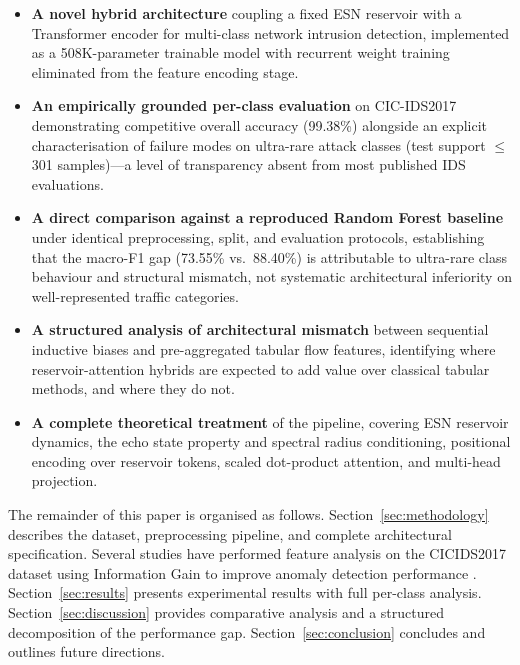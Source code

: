 \documentclass[5p,times]{elsarticle}
\begin{document}
	\begin{itemize}[leftmargin=15pt,itemsep=3pt,topsep=4pt]
		
		\item \textbf{A novel hybrid architecture} coupling a fixed ESN
		reservoir with a Transformer encoder for multi-class network
		intrusion detection, implemented as a 508K-parameter trainable
		model with recurrent weight training eliminated from the feature
		encoding stage.
		
		\item \textbf{An empirically grounded per-class evaluation} on
		CIC-IDS2017 demonstrating competitive overall accuracy (99.38\%)
		alongside an explicit characterisation of failure modes on
		ultra-rare attack classes (test support $\leq$ 301 samples)---a
		level of transparency absent from most published IDS evaluations.
		
		\item \textbf{A direct comparison against a reproduced Random Forest
			baseline} under identical preprocessing, split, and evaluation
		protocols, establishing that the macro-F1 gap (73.55\% vs.\
		88.40\%) is attributable to ultra-rare class behaviour and
		structural mismatch, not systematic architectural inferiority on
		well-represented traffic categories.
		
		\item \textbf{A structured analysis of architectural mismatch}
		between sequential inductive biases and pre-aggregated tabular flow
		features, identifying where reservoir-attention hybrids are
		expected to add value over classical tabular methods, and where
		they do not.
		
		\item \textbf{A complete theoretical treatment} of the pipeline,
		covering ESN reservoir dynamics, the echo state property and
		spectral radius conditioning, positional encoding over reservoir
		tokens, scaled dot-product attention, and multi-head projection.
		
	\end{itemize}
	
	The remainder of this paper is organised as follows.
	Section~\ref{sec:methodology} describes the dataset, preprocessing
	pipeline, and complete architectural specification.
	Several studies have performed feature analysis on the CICIDS2017 dataset using Information Gain to improve anomaly detection performance \cite{rf2020}.
	Section~\ref{sec:results} presents experimental results with full
	per-class analysis. Section~\ref{sec:discussion} provides comparative
	analysis and a structured decomposition of the performance gap.
	Section~\ref{sec:conclusion} concludes and outlines future directions.
	
\end{document}
